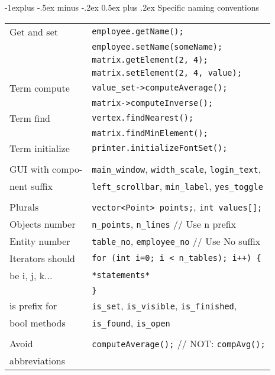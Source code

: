 \documentclass[10pt,landscape]{article}
\makeatletter
\renewcommand{\subsection}{\@startsection{subsection}{2}{0mm}%
                                {-1explus -.5ex minus -.2ex}%
                                {0.5ex plus .2ex}%
                                {\normalfont\normalsize\bfseries}}
\makeatother
\begin{document}
\begin{multicols}{3}
\subsection{Specific naming conventions}
\begin{tabular}{@{}ll@{}}
	Get and set     & \verb!employee.getName();! \\
	                & \verb!employee.setName(someName);! \\
	                & \verb!matrix.getElement(2, 4);! \\
	                & \verb!matrix.setElement(2, 4, value);! \\
	Term compute    & \verb!value_set->computeAverage();! \\
	                & \verb!matrix->computeInverse();! \\
	Term find       & \verb!vertex.findNearest();! \\
	                & \verb!matrix.findMinElement();! \\
	Term initialize & \verb!printer.initializeFontSet();! \\
	                & \\
	GUI with compo- & \verb!main_window!, \verb!width_scale!, \verb!login_text!, \\
	nent suffix     & \verb!left_scrollbar!, \verb!min_label!, \verb!yes_toggle! \\
	                & \\
	Plurals         & \verb!vector<Point> points;!, \verb!int values[];! \\
	Objects number  & \verb!n_points!, \verb!n_lines! // Use n prefix\\
	Entity number   & \verb!table_no!, \verb!employee_no! // Use No suffix\\
	Iterators should& \verb!for (int i=0; i < n_tables); i++) {!\\ 
	be i, j, k...   & \hspace{0.5cm} \verb!*statements*! \\
	                & \verb!}!\\
	is prefix for   & \verb!is_set!, \verb!is_visible!, \verb!is_finished!, \\
	bool methods    & \verb!is_found!, \verb!is_open! \\
	                & \\
	Avoid           & \verb!computeAverage();! // NOT: \verb!compAvg();! \\
	abbreviations   & \\ 

\end{tabular}
\end{multicols}
\end{document}

